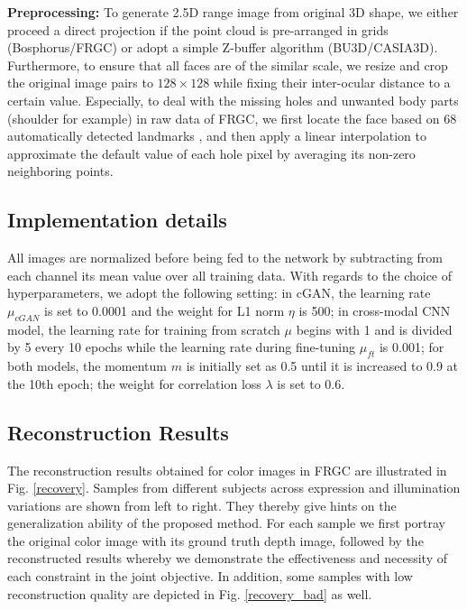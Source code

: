\documentclass{bmvc2k}
\begin{document}
\textbf{Preprocessing:} To generate 2.5D range image from original 3D shape, we either proceed a direct projection if the point cloud is pre-arranged in grids (Bosphorus/FRGC) or adopt a simple Z-buffer algorithm (BU3D/CASIA3D). Furthermore, to ensure that all faces are of the similar scale, we resize and crop the original image pairs to $128\times128$ while fixing their inter-ocular distance to a certain value. Especially, to deal with the missing holes and unwanted body parts (shoulder for example) in raw data of FRGC, we first locate the face based on 68 automatically detected landmarks \cite{asthana2014incremental}, and then apply a linear interpolation to approximate the default value of each hole pixel by averaging its non-zero neighboring points. %



\subsection{Implementation details} 

All images are normalized before being fed to the network by subtracting from each channel its mean value over all training data. With regards to the choice of hyperparameters, we adopt the following setting: in cGAN, the learning rate $\mu_{cGAN}$ is set to 0.0001 and the weight for L1 norm $\eta$ is 500; in cross-modal CNN model, the learning rate for training from scratch $\mu$ begins with 1 and is divided by 5 every 10 epochs while the learning rate during fine-tuning $\mu_{ft}$ is 0.001; for both models, the momentum $m$ is initially set as 0.5 until it is increased to 0.9 at the 10th epoch; the weight for correlation loss $\lambda$ is set to 0.6.

\subsection{Reconstruction Results}

The reconstruction results obtained for color images in FRGC are illustrated in Fig. \ref{recovery}. Samples from different subjects across expression and illumination variations are shown from left to right. They thereby give hints on the generalization ability of the proposed method. For each sample we first portray the original color image with its ground truth depth image, followed by the reconstructed results whereby we demonstrate the effectiveness and necessity of each constraint in the joint objective. In addition, some samples with low reconstruction quality are depicted in Fig. \ref{recovery_bad} as well.
\end{document}
